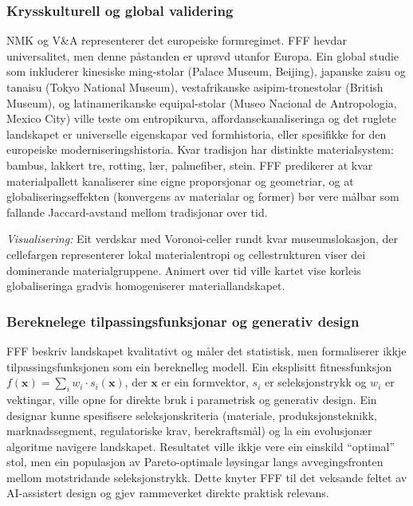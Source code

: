 \documentclass[10pt, a4paper, twocolumn]{article}
\begin{document}
\subsubsection{Krysskulturell og global validering}

NMK og V\&A representerer det europeiske formregimet. FFF hevdar universalitet, men denne påstanden er uprøvd utanfor Europa. Ein global studie som inkluderer kinesiske ming-stolar (Palace Museum, Beijing), japanske zaisu og tanaisu (Tokyo National Museum), vestafrikanske asipim-tronestolar (British Museum), og latinamerikanske equipal-stolar (Museo Nacional de Antropologia, Mexico City) ville teste om entropikurva, affordansekanaliseringa og det ruglete landskapet er universelle eigenskapar ved formhistoria, eller spesifikke for den europeiske moderniseringshistoria. Kvar tradisjon har distinkte materialsystem: bambus, lakkert tre, rotting, lær, palmefiber, stein. FFF predikerer at kvar materialpallett kanaliserer sine eigne proporsjonar og geometriar, og at globaliseringseffekten (konvergens av materialar og former) bør vere målbar som fallande Jaccard-avstand mellom tradisjonar over tid.

\textit{Visualisering:} Eit verdskar med Voronoi-celler rundt kvar museumslokasjon, der cellefargen representerer lokal materialentropi og cellestrukturen viser dei dominerande materialgruppene. Animert over tid ville kartet vise korleis globaliseringa gradvis homogeniserer materiallandskapet.

\subsubsection{Bereknelege tilpassingsfunksjonar og generativ design}

FFF beskriv landskapet kvalitativt og måler det statistisk, men formaliserer ikkje tilpassingsfunksjonen som ein bereknelleg modell. Ein eksplisitt fitnessfunksjon $f(\mathbf{x}) = \sum_i w_i \cdot s_i(\mathbf{x})$, der $\mathbf{x}$ er ein formvektor, $s_i$ er seleksjonstrykk og $w_i$ er vektingar, ville opne for direkte bruk i parametrisk og generativ design. Ein designar kunne spesifisere seleksjonskriteria (materiale, produksjonsteknikk, marknadssegment, regulatoriske krav, berekraftsmål) og la ein evolusjonær algoritme navigere landskapet. Resultatet ville ikkje vere ein einskild ``optimal'' stol, men ein populasjon av Pareto-optimale løysingar langs avvegingsfronten mellom motstridande seleksjonstrykk. Dette knyter FFF til det veksande feltet av AI-assistert design og gjev rammeverket direkte praktisk relevans.
\end{document}
